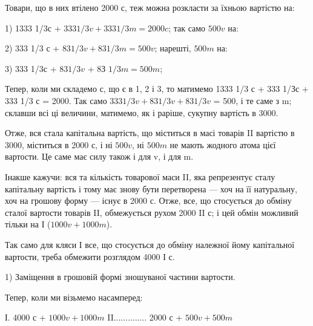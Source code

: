 Товари, що в них втілено 2000 с, теж можна розкласти за їхньою
вартістю на:

1) 1333 1/3с + $333 1/3 v + 333 1/3m = 2000c$; так само $500 v$ на:

2) 333 1/3 с + $83 1/3 v + 83 1/3 m = 500 v$; нарешті, $500 m$ на:

3) 333 1/3с + $83 1/3 v$ + 8З $1/3 m = 500 m$;

Тепер, коли ми складемо с, що є в 1, 2 і 3, то матимемо 1333 1/3 с
+ 333 1/Зс + 333 1/3 с = 2000. Так само $333 1/3v + 83 1/3v + 83 1/3v$
= 500, і те саме з m; склавши всі ці величини, матимемо, як і раріше,
сукупну вартість в 3000.

Отже, вся стала капітальна вартість, що міститься в масі товарів II
вартістю в 3000, міститься в 2000 с, і ні $500 v$, ні $500 m$ не мають
жодного атома цієї вартости. Це саме має силу також і для v, і для m.

Інакше кажучи: вся та кількість товарової маси II, яка репрезентує
сталу капітальну вартість і тому має знову бути перетворена — хоч
на її натуральну, хоч на грошову форму — існує в 2000 с. Отже, все, що
стосується до обміну сталої вартости товарів II, обмежується рухом 2000
II с; і цей обмін можливий тільки на І ($1000 v + 1000 m$).

Так само для кляси І все, що стосується до обміну належної йому
капітальної вартости, треба обмежити розглядом 4000 І с.

1) Заміщення в грошовій формі зношуваної частини вартости.

Тепер, коли ми візьмемо насамперед:

І. 4000 с + $1000 v + 1000 m$
II..............  2000 с + $500 v + 500 m$


